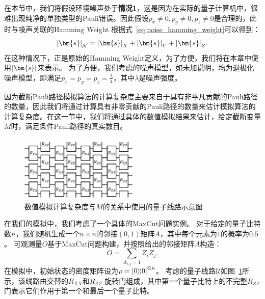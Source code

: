 在本节中，我们将假设环境噪声处于\textbf{情况1}，这是因为在实际的量子计算机中，很难出现纯净的单独类型的Pauli错误。因此假设$p_x\neq 0,p_y\neq 0,p_z\neq 0$是合理的，此时与噪声关联的Hamming Weight 根据式~\eqref{eq:noise_hamming_weight}可以得到：
\begin{equation*}
    \abs{\bm{s}}_{\mathcal{N}}=\abs{\bm{s}}_X + \abs{\bm{s}}_Y + \abs{\bm{s}}_Z.
\end{equation*}
在这种情况下，正是原始的Hamming Weight定义，为了方便，我们将在本章中使用$\abs{\bm{s}}$来表示。
为了方便，我们考虑的噪声模型，如未加说明，均为退极化噪声模型，即满足$p_x=p_y=p_z=\frac{\lambda}{4}$，其中$\lambda$是噪声强度。




因为截断Pauli路径模拟算法的计算复杂度主要来自于具有非平凡贡献的Pauli路径的数量，因此我们将通过计算具有非零贡献的Pauli路径的数量来估计模拟算法的计算复杂度。在这一节中，我们将通过具体的数值模拟结果来估计，给定截断变量$M$时，满足条件Pauli路径的真实数目。


\begin{figure}[htbp]
    \centering
    \includegraphics[width=0.5\textwidth]{figures/XX_ZZ_Ansatz.pdf}
    \caption{数值模拟计算复杂度与$M$的关系中使用的量子线路示意图}\label{fig:XX_ZZ_Ansatz}
\end{figure}

在我们的模拟中，我们考虑了一个具体的MaxCut问题实例。
对于给定的量子比特数$n$，我们随机生成一个$n\times n$的邻接$(0,1)$矩阵$A$，其中每个元素为$1$的概率为$0.5$。
可观测量$O$基于MaxCut问题构建，并按照给出的邻接矩阵$A$构造：
\begin{equation}
    O=\sum_{A_{i,j}=1} Z_iZ_j.
\end{equation}
在模拟中，初始状态的密度矩阵设为$\rho=\ketbra{0}{0}^{\otimes n}$。
考虑的量子线路$\mathcal{U}$如图~\ref{fig:XX_ZZ_Ansatz}所示，该线路由交替的$R_{XX}$和$R_{ZZ}$ 旋转门组成，其中第一个量子比特上的不完整$R_{ZZ}$门表示它们作用于第一个和最后一个量子比特。


